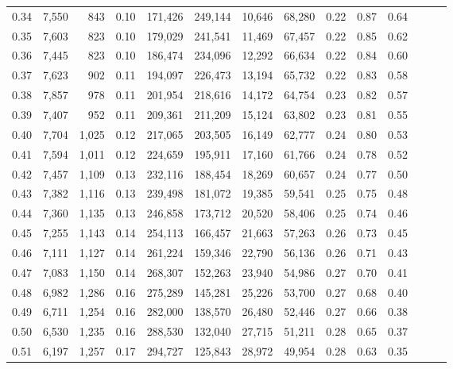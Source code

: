 \begin{tabular}{rrrrrrrrrrrrrr}
0.34 &   7,550 &    843 &  0.10 &  171,426 &  249,144 &  10,646 &  68,280 &  0.22 &  0.87 &      0.64 \\
0.35 &   7,603 &    823 &  0.10 &  179,029 &  241,541 &  11,469 &  67,457 &  0.22 &  0.85 &      0.62 \\
0.36 &   7,445 &    823 &  0.10 &  186,474 &  234,096 &  12,292 &  66,634 &  0.22 &  0.84 &      0.60 \\
0.37 &   7,623 &    902 &  0.11 &  194,097 &  226,473 &  13,194 &  65,732 &  0.22 &  0.83 &      0.58 \\
0.38 &   7,857 &    978 &  0.11 &  201,954 &  218,616 &  14,172 &  64,754 &  0.23 &  0.82 &      0.57 \\
0.39 &   7,407 &    952 &  0.11 &  209,361 &  211,209 &  15,124 &  63,802 &  0.23 &  0.81 &      0.55 \\
0.40 &   7,704 &  1,025 &  0.12 &  217,065 &  203,505 &  16,149 &  62,777 &  0.24 &  0.80 &      0.53 \\
0.41 &   7,594 &  1,011 &  0.12 &  224,659 &  195,911 &  17,160 &  61,766 &  0.24 &  0.78 &      0.52 \\
0.42 &   7,457 &  1,109 &  0.13 &  232,116 &  188,454 &  18,269 &  60,657 &  0.24 &  0.77 &      0.50 \\
0.43 &   7,382 &  1,116 &  0.13 &  239,498 &  181,072 &  19,385 &  59,541 &  0.25 &  0.75 &      0.48 \\
0.44 &   7,360 &  1,135 &  0.13 &  246,858 &  173,712 &  20,520 &  58,406 &  0.25 &  0.74 &      0.46 \\
0.45 &   7,255 &  1,143 &  0.14 &  254,113 &  166,457 &  21,663 &  57,263 &  0.26 &  0.73 &      0.45 \\
0.46 &   7,111 &  1,127 &  0.14 &  261,224 &  159,346 &  22,790 &  56,136 &  0.26 &  0.71 &      0.43 \\
0.47 &   7,083 &  1,150 &  0.14 &  268,307 &  152,263 &  23,940 &  54,986 &  0.27 &  0.70 &      0.41 \\
0.48 &   6,982 &  1,286 &  0.16 &  275,289 &  145,281 &  25,226 &  53,700 &  0.27 &  0.68 &      0.40 \\
0.49 &   6,711 &  1,254 &  0.16 &  282,000 &  138,570 &  26,480 &  52,446 &  0.27 &  0.66 &      0.38 \\
0.50 &   6,530 &  1,235 &  0.16 &  288,530 &  132,040 &  27,715 &  51,211 &  0.28 &  0.65 &      0.37 \\
0.51 &   6,197 &  1,257 &  0.17 &  294,727 &  125,843 &  28,972 &  49,954 &  0.28 &  0.63 &      0.35 \\

\end{tabular}
